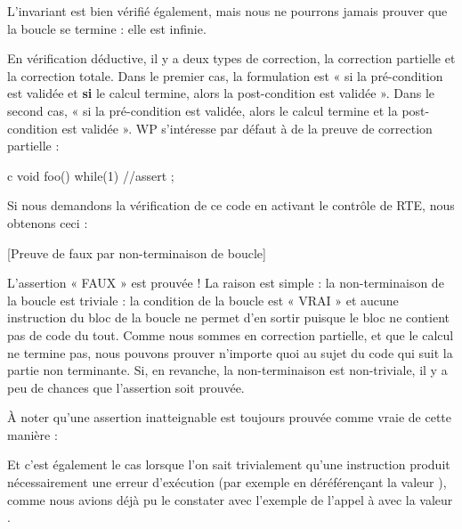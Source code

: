 \documentclass[middle]{zmdocument}
\begin{document}
L'invariant est bien vérifié également, mais nous ne pourrons jamais prouver
que la boucle se termine : elle est infinie.





En vérification déductive, il y a deux types de correction, la correction 
partielle et la correction totale. Dans le premier cas, la formulation est 
« si la pré-condition est validée et \textbf{si} le calcul termine, alors la 
post-condition est validée ». Dans le second cas, « si la pré-condition est 
validée, alors le calcul termine et la post-condition est validée ». WP 
s'intéresse par défaut à de la preuve de correction partielle :



\begin{CodeBlock}{c}
void foo(){
  while(1){}
  //assert \false;
}
\end{CodeBlock}



Si nous demandons la vérification de ce code en activant le contrôle de RTE,
nous obtenons ceci :



[Preuve de faux par non-terminaison de boucle]


L'assertion « FAUX » est prouvée ! La raison est simple : la non-terminaison de
la boucle est triviale : la condition de la boucle est « VRAI » et aucune instruction
du bloc de la boucle ne permet d'en sortir puisque le bloc ne contient pas de code du
tout. Comme nous sommes en correction partielle, et que le calcul ne termine pas, nous
pouvons prouver n'importe quoi au sujet du code qui suit la partie non terminante. Si,
en revanche, la non-terminaison est non-triviale, il y a peu de chances que l'assertion
soit prouvée.



\begin{Information}
À noter qu'une assertion inatteignable est toujours prouvée comme vraie de cette 
manière :

Et c'est également le cas lorsque l'on sait trivialement qu'une instruction
produit nécessairement une erreur d'exécution (par exemple en déréférençant 
la valeur ), comme nous avions déjà pu le constater avec l'exemple
de l'appel à  avec la valeur .
\end{Information}
\end{document}
